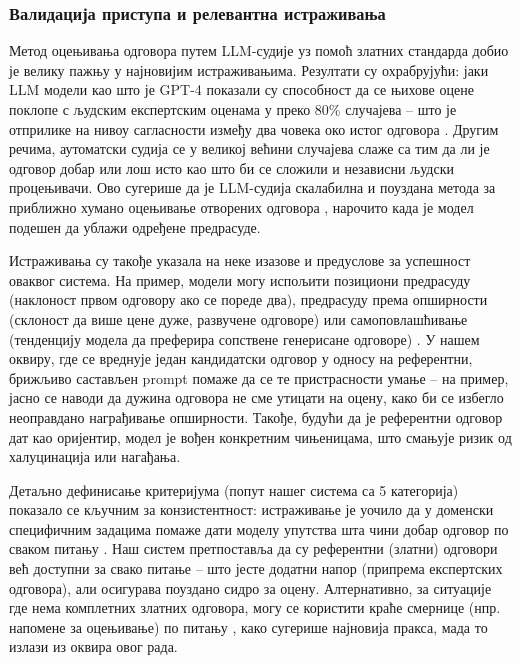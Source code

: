 \subsubsection{Валидација приступа и релевантна истраживања}

Метод оцењивања одговора путем LLM-судије уз помоћ златних стандарда добио је велику пажњу у најновијим истраживањима. Резултати су охрабрујући: јаки LLM модели као што је GPT-4 показали су способност да се њихове оцене поклопе с људским експертским оценама у преко 80\% случајева -- што је отприлике на нивоу сагласности између два човека око истог одговора \cite{zheng_judging_llm_2023,evidently_ai_llm_judge_2025}. Другим речима, аутоматски судија се у великој већини случајева слаже са тим да ли је одговор добар или лош исто као што би се сложили и независни људски процењивачи. Ово сугерише да је LLM-судија скалабилна и поуздана метода за приближно хумано оцењивање отворених одговора \cite{evidently_ai_llm_judge_2025}, нарочито када је модел подешен да ублажи одређене предрасуде.

Истраживања су такође указала на неке изазове и предуслове за успешност оваквог система. На пример, модели могу испољити позициони предрасуду (наклоност првом одговору ако се пореде два), предрасуду према опширности (склоност да више цене дуже, развучене одговоре) или самоповлашћивање (тенденцију модела да преферира сопствене генерисане одговоре) \cite{zheng_judging_llm_2023,verga_replacing_judges_2024}. У нашем оквиру, где се вреднује један кандидатски одговор у односу на референтни, брижљиво састављен prompt помаже да се те пристрасности умање -- на пример, јасно се наводи да дужина одговора не сме утицати на оцену, како би се избегло неоправдано награђивање опширности. Такође, будући да је референтни одговор дат као оријентир, модел је вођен конкретним чињеницама, што смањује ризик од халуцинација или нагађања.

Детаљно дефинисање критеријума (попут нашег система са 5 категорија) показало се кључним за конзистентност: истраживање је уочило да у доменски специфичним задацима помаже дати моделу упутства шта чини добар одговор по сваком питању \cite{clearwater_analytics_2023}. Наш систем претпоставља да су референтни (златни) одговори већ доступни за свако питање -- што јесте додатни напор (припрема експертских одговора), али осигурава поуздано сидро за оцену. Алтернативно, за ситуације где нема комплетних златних одговора, могу се користити краће смернице (нпр. напомене за оцењивање) по питању \cite{verga_replacing_judges_2024}, како сугерише најновија пракса, мада то излази из оквира овог рада.

